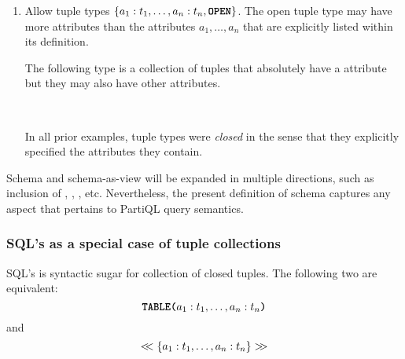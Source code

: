 {\begin{enumerate}

\begin{example}
The following type describes a collection of tuples that always have a
 attribute and this attribute is never .
\begin{tabbing}
\ \ \  
\end{tabbing}
Contrast with Examples~\ref{xmpl:optional-date1-attr}
and~\ref{xmpl:required-date1-attr}.
\end{example}

\item Allow  tuple types $\{a_1:t_1,\ldots,a_n:t_n,\texttt{\textbf{OPEN}}\}$. The
open tuple type may have more attributes than the attributes $a_1,\ldots,a_n$
that are explicitly listed within its definition.
\begin{example}
The following type is a collection of tuples that absolutely have a 
attribute but they may also have other attributes.
\begin{tabbing}
\ \ \  
\end{tabbing}
In all prior examples, tuple types were \textit{closed} in the sense that they
explicitly specified the attributes they contain.
\end{example}

\end{enumerate}

 Schema and schema-as-view will be expanded in
multiple directions, such as inclusion of , ,
, etc. Nevertheless, the present definition of schema captures
any aspect that pertains to PartiQL query semantics.

\subsubsection{SQL's  as a special case of tuple collections}
\label{sec:create-table}
SQL's  is syntactic sugar for collection of closed tuples. The
following two are equivalent:
\[ \texttt{\textbf{TABLE(}}a_1:t_1, \ldots, a_n:t_n\texttt{\textbf{)}} \] \noindent and
\[ <\!\!< \{ a_1:t_1, \ldots, a_n:t_n \} >\!\!> \]

}
